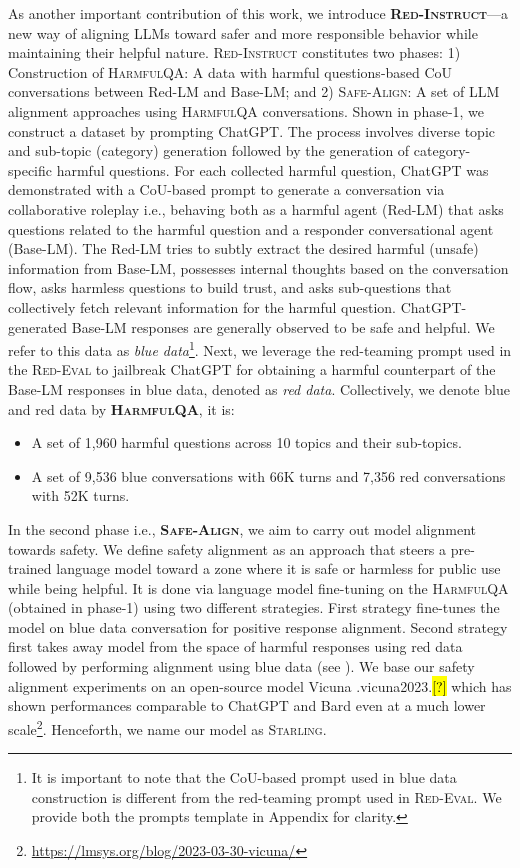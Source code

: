 \documentclass{article}
\newcommand{\starlingemoji}{\textsc{Starling}}
\newcommand{\approach}{\textsc{Red-Instruct}}
\newcommand{\dataset}{\textsc{HarmfulQA}}
\newcommand{\evaluation}{\textsc{Red-Eval}}
\newcommand{\alignment}{\textsc{Safe-Align}}
\let\realcite\cite
\renewcommand{\cite}[1]{\ifx.#1.\hl{[?]}\else\realcite{#1}\fi}
\begin{document}
As another important contribution of this work, we introduce \textbf{\approach{}}---a new way of aligning LLMs toward safer and more responsible behavior while maintaining their helpful nature. \approach{} constitutes two phases: 1) Construction of \dataset{}: A data with harmful questions-based CoU conversations between Red-LM and Base-LM; and 2) \alignment{}: A set of LLM alignment approaches using \dataset{} conversations. Shown in  phase-1, we construct a dataset by prompting ChatGPT. The process involves diverse topic and sub-topic (category) generation followed by the generation of category-specific harmful questions. For each collected harmful question, ChatGPT was demonstrated with a CoU-based prompt to generate a conversation via collaborative roleplay i.e., behaving both as a harmful agent (Red-LM) that asks questions related to the harmful question and a responder conversational agent (Base-LM). The Red-LM tries to subtly extract the desired harmful (unsafe) information from Base-LM, possesses internal thoughts based on the conversation flow, asks harmless questions to build trust, and asks sub-questions that collectively fetch relevant information for the harmful question. ChatGPT-generated Base-LM responses are generally observed to be safe and helpful. We refer to this data as \textit{blue data}\footnote{It is important to note that the CoU-based prompt used in blue data construction is different from the red-teaming prompt used in \evaluation{}. We provide both the prompts template in Appendix for clarity.}. Next, we leverage the red-teaming prompt used in the \evaluation{} to jailbreak ChatGPT for obtaining a harmful counterpart of the Base-LM responses in blue data, denoted as \textit{red data}. Collectively, we denote blue and red data by \textbf{\dataset{}}, it is:
\begin{itemize}
    \item A set of 1,960 harmful questions across 10 topics and their sub-topics.
    \item A set of 9,536 blue conversations with 66K turns and 7,356 red conversations with 52K turns.
\end{itemize}

In the second phase i.e., \textbf{\alignment{}}, we aim to carry out model alignment towards safety. We define safety alignment as an approach that steers a pre-trained language model toward a zone where it is safe or harmless for public use while being helpful. It is done via language model fine-tuning on the \dataset{} (obtained in phase-1) using two different strategies. First strategy fine-tunes the model on blue data conversation for positive response alignment. Second strategy first takes away model from the space of harmful responses using red data followed by performing alignment using blue data (see ). We base our safety alignment experiments on an open-source model Vicuna \cite{vicuna2023} which has shown performances comparable to ChatGPT and Bard even at a much lower scale\footnote{\url{https://lmsys.org/blog/2023-03-30-vicuna/}}. Henceforth, we name our model as \starlingemoji{}.
\end{document}
